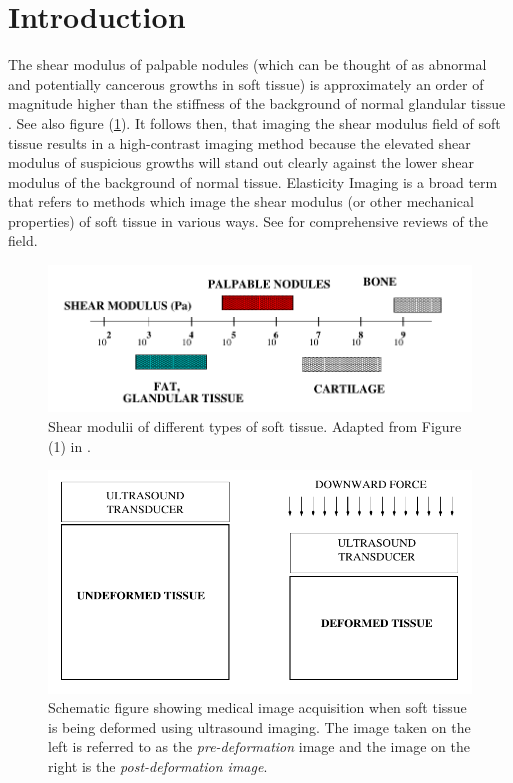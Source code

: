 \documentclass[12pt]{article}
\begin{document}
\section{Introduction}
The shear modulus of palpable nodules (which can be thought of as abnormal and potentially cancerous growths in soft tissue) is approximately an order of magnitude higher than the stiffness of the background of normal glandular tissue \cite{paper:sarv1998}. See also figure (\ref{fig:shearmod}). It follows then, that imaging the shear modulus field of soft tissue results in a high-contrast imaging method because the elevated shear modulus of suspicious growths will stand out clearly against the lower shear modulus of the background of normal tissue. Elasticity Imaging is a broad term that refers to methods which image the shear modulus (or other mechanical properties) of soft tissue in various ways. See \cite{paper:gao1996,paper:parker2010,book:alamgarra2019,bookchap:oberaibarbone2019} for comprehensive reviews of the field.
%
\begin{figure}[!h]
   \centering
    \includegraphics[totalheight=3cm]{Figures/shearmod.png}
  \caption{\label{fig:shearmod} Shear modulii of different types of soft tissue. Adapted from Figure (1) in \cite{paper:sarv1998}.}
\end{figure}
%
\begin{figure}[!h]
   \centering
    \includegraphics[totalheight=5cm]{Figures/prepostimage.png}
  \caption{\label{fig:prepostimage} Schematic figure showing medical image acquisition when soft tissue is being deformed using ultrasound imaging. The image taken on the left is referred to as the \textit{pre-deformation} image and the image on the right is the \textit{post-deformation image}.}
\end{figure}
%
\end{document}
